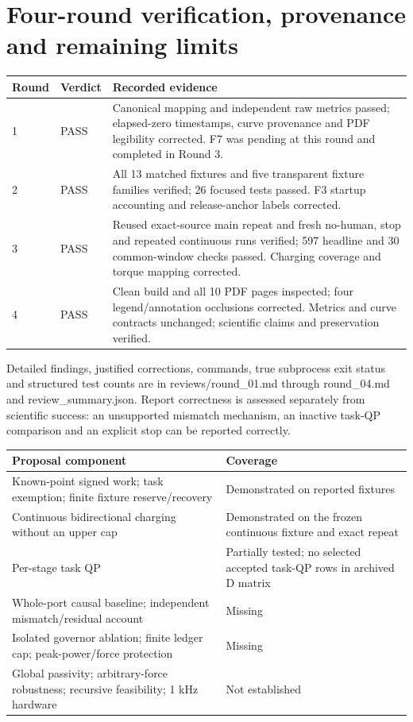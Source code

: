 \documentclass[10pt,letterpaper]{article}
\renewcommand{\arraystretch}{1.1}
\begin{document}
\section*{Four-round verification, provenance and remaining limits}
\begingroup
\small
\setlength{\tabcolsep}{4pt}
\renewcommand{\arraystretch}{1.16}
\begin{tabular}{@{}p{}p{}p{}@{}}
\toprule
\textbf{Round} & \textbf{Verdict} & \textbf{Recorded evidence} \\
\midrule
1 & PASS & Canonical mapping and independent raw metrics passed; elapsed-zero timestamps, curve provenance and PDF legibility corrected. F7 was pending at this round and completed in Round 3. \\
2 & PASS & All 13 matched fixtures and five transparent fixture families verified; 26 focused tests passed. F3 startup accounting and release-anchor labels corrected. \\
3 & PASS & Reused exact-source main repeat and fresh no-human, stop and repeated continuous runs verified; 597 headline and 30 common-window checks passed. Charging coverage and torque mapping corrected. \\
4 & PASS & Clean build and all 10 PDF pages inspected; four legend/annotation occlusions corrected. Metrics and curve contracts unchanged; scientific claims and preservation verified. \\
\bottomrule
\end{tabular}
\endgroup


Detailed findings, justified corrections, commands, true subprocess exit status and structured test counts are in reviews/round\_01.md through round\_04.md and review\_summary.json. Report correctness is assessed separately from scientific success: an unsupported mismatch mechanism, an inactive task-QP comparison and an explicit stop can be reported correctly.


\begingroup
\small
\setlength{\tabcolsep}{4pt}
\renewcommand{\arraystretch}{1.16}
\begin{tabular}{@{}p{}p{}@{}}
\toprule
\textbf{Proposal component} & \textbf{Coverage} \\
\midrule
Known-point signed work; task exemption; finite fixture reserve/recovery & Demonstrated on reported fixtures \\
Continuous bidirectional charging without an upper cap & Demonstrated on the frozen continuous fixture and exact repeat \\
Per-stage task QP & Partially tested; no selected accepted task-QP rows in archived D matrix \\
Whole-port causal baseline; independent mismatch/residual account & Missing \\
Isolated governor ablation; finite ledger cap; peak-power/force protection & Missing \\
Global passivity; arbitrary-force robustness; recursive feasibility; 1 kHz hardware & Not established \\
\bottomrule
\end{tabular}
\endgroup
\end{document}
